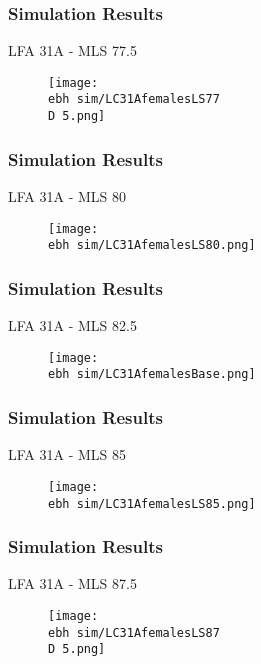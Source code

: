 \documentclass{beamer}
\newcommand{\ebh}{\string~/bio.data/bio.lobster/figures/LFA2733Framework2018/} %
\newcommand{\D}{.}
\begin{document}
\begin{frame}
\frametitle{Simulation Results}
LFA 31A - MLS 77.5
\begin{figure}
        \begin{center}
            \texttt{[image: \\ebh sim/LC31AfemalesLS77\\D 5.png]}
        \end{center}
    \end{figure}
\end{frame}


\begin{frame}
\frametitle{Simulation Results}
LFA 31A - MLS 80
\begin{figure}
        \begin{center}
            \texttt{[image: \\ebh sim/LC31AfemalesLS80.png]}
        \end{center}
    \end{figure}
\end{frame}


\begin{frame}
\frametitle{Simulation Results}
LFA 31A - MLS 82.5
\begin{figure}
        \begin{center}
            \texttt{[image: \\ebh sim/LC31AfemalesBase.png]}
        \end{center}
    \end{figure}
\end{frame}



\begin{frame}
\frametitle{Simulation Results}
LFA 31A - MLS 85
\begin{figure}
        \begin{center}
            \texttt{[image: \\ebh sim/LC31AfemalesLS85.png]}
        \end{center}
    \end{figure}
\end{frame}


\begin{frame}
\frametitle{Simulation Results}
LFA 31A - MLS 87.5
\begin{figure}
        \begin{center}
            \texttt{[image: \\ebh sim/LC31AfemalesLS87\\D 5.png]}
        \end{center}
    \end{figure}
\end{frame}
\end{document}
